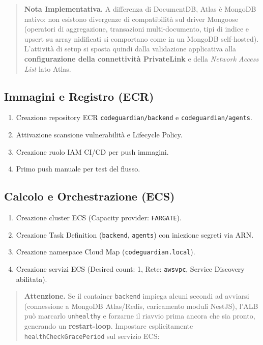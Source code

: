 \documentclass[11pt,a4paper]{article}
\begin{document}
\begin{quote}
\textbf{Nota Implementativa.} A differenza di DocumentDB, Atlas è MongoDB nativo: non esistono divergenze di compatibilità sul driver Mongoose (operatori di aggregazione, transazioni multi-documento, tipi di indice e upsert su array nidificati si comportano come in un MongoDB self-hosted). L'attività di setup si sposta quindi dalla validazione applicativa alla \textbf{configurazione della connettività PrivateLink} e della \emph{Network Access List} lato Atlas.
\end{quote}

\subsection{Immagini e Registro (ECR)}

\begin{enumerate}
    \item Creazione repository ECR \texttt{codeguardian/backend} e \texttt{codeguardian/agents}.
    \item Attivazione scansione vulnerabilità e Lifecycle Policy.
    \item Creazione ruolo IAM CI/CD per push immagini.
    \item Primo push manuale per test del flusso.
\end{enumerate}

\subsection{Calcolo e Orchestrazione (ECS)}

\begin{enumerate}
    \item Creazione cluster ECS (Capacity provider: \texttt{FARGATE}).
    \item Creazione Task Definition (\texttt{backend}, \texttt{agents}) con iniezione segreti via ARN.
    \item Creazione namespace Cloud Map (\texttt{codeguardian.local}).
    \item Creazione servizi ECS (Desired count: 1, Rete: \texttt{awsvpc}, Service Discovery abilitata).
\end{enumerate}

\begin{quote}
\textbf{Attenzione.} Se il container \texttt{backend} impiega alcuni secondi ad avviarsi (connessione a MongoDB Atlas/Redis, caricamento moduli NestJS), l'ALB può marcarlo \texttt{unhealthy} e forzarne il riavvio prima ancora che sia pronto, generando un \textbf{restart-loop}. Impostare esplicitamente \texttt{healthCheckGracePeriod} sul servizio ECS:
\end{quote}
\end{document}
